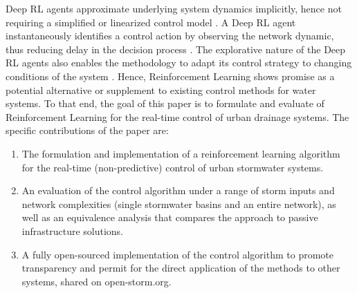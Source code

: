 Deep RL agents approximate underlying system dynamics implicitly, hence not requiring a simplified or linearized control model \cite{Sutton98}.
A Deep RL agent instantaneously identifies a control action by observing the network dynamic, thus reducing delay in the decision process \cite{Mnih2015, Silver2017MasteringAlgorithm}.
The explorative nature of the Deep RL agents also enables the methodology to adapt its control strategy to changing conditions of the system \cite{Sutton98}.
Hence, Reinforcement Learning shows promise as a potential alternative or supplement to existing control methods for water systems.
To that end, the goal of this paper is to formulate and evaluate of Reinforcement Learning for the real-time control of urban drainage systems.
The specific contributions of the paper are:
\begin{enumerate}
    \item The formulation and implementation of a reinforcement learning algorithm for the real-time (non-predictive) control of urban stormwater systems.
    \item An evaluation of the control algorithm under a range of storm inputs and network complexities (single stormwater basins and an entire network), as well as an equivalence analysis that compares the approach to passive infrastructure solutions.
    \item A fully open-sourced implementation of the control algorithm to promote transparency and permit for the direct application of the methods to other systems, shared on open-storm.org.
\end{enumerate}

